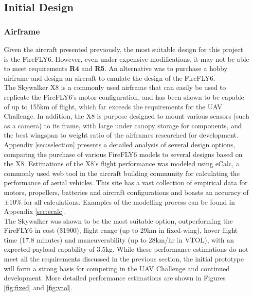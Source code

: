 \subsection{Initial Design}
\subsubsection*{Airframe}
Given the aircraft presented previously, the most suitable design for this project is the FireFLY6. However, even under expensive modifications, it may not be able to meet requirements \textbf{R4} and \textbf{R5}. An alternative was to purchase a hobby airframe and design an aircraft to emulate the design of the FireFLY6.\\

The Skywalker X8\cite{ref:x8} is a commonly used airframe that can easily be used to replicate the FireFLY6's motor configuration, and has been shown to be capable of up to 155km of flight\cite{ref:range}, which far exceeds the requirements for the UAV Challenge. In addition, the X8 is purpose designed to mount various sensors (such as a camera) to its frame, with large under canopy storage for components, and the best wingspan to weight ratio of the airframes researched for development.\\

Appendix \ref{sec:selection} presents a detailed analysis of several design options, comparing the purchase of various FireFLY6 models to several designs based on the X8. Estimations of the X8's flight performance was modeled using eCalc\cite{ref:ecalc}, a commonly used web tool in the aircraft building community for calculating the performance of aerial vehicles. This site has a vast collection of empirical data for motors, propellers, batteries and aircraft configurations and boasts an accuracy of $\pm$10\% for all calculations. Examples of the modelling process can be found in Appendix \ref{sec:ecalc}.\\

The Skywalker was shown to be the most suitable option, outperforming the FireFLY6 in cost (\~\$1900), flight range (up to 29km in fixed-wing), hover flight time (17.8 minutes) and maneuverability (up to 28km/hr in VTOL), with an expected payload capability of 3.5kg. While these performance estimations do not meet all the requirements discussed in the previous section, the initial prototype will form a strong basis for competing in the UAV Challenge and continued development. More detailed performance estimations are shown in Figures \ref{fig:fixed} and \ref{fig:vtol}.


